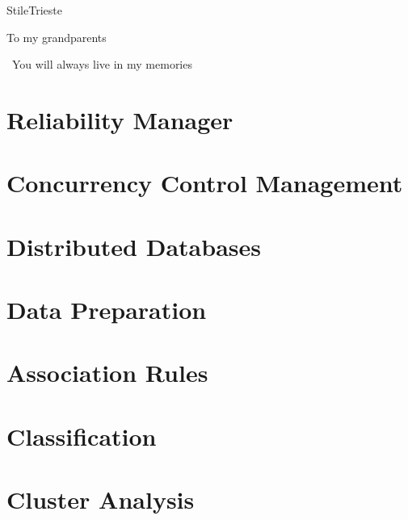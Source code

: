 \documentclass[pdfa,cucitura]{toptesi}
\begin{document}
\english


\expandafter\ifx\csname StileTrieste\endcsname\relax
\else
	\paginavuota
	\begin{dedica}
		To my grandparents

		\textdagger\ You will always live in my memories
	\end{dedica}
	\tomo
\fi

\sommario


\indici

\mainmatter

\chapter{Reliability Manager}


\chapter{Concurrency Control Management}


\chapter{Distributed Databases}


\chapter{Data Preparation}


\chapter{Association Rules}


\chapter{Classification}


\chapter{Cluster Analysis}

\end{document}
